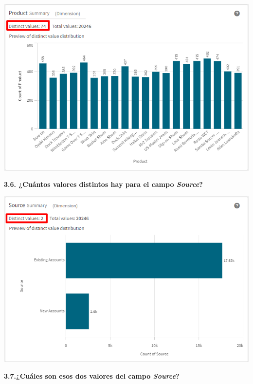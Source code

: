 \documentclass{article}
\begin{document}
    \begin{center}
		\includegraphics[width=14cm]{./images/6.3} 
	\end{center}
	
	\newpage
\textbf{3.6. ¿Cuántos valores 
distintos hay para el campo \textit{\textbf{Source}}?}

    \begin{center}
		\includegraphics[width=14cm]{./images/6.4} 
	\end{center}
	
	\newpage
\textbf{3.7.¿Cuáles son esos dos valores del campo \textit{\textbf{Source}}?}
\end{document}
